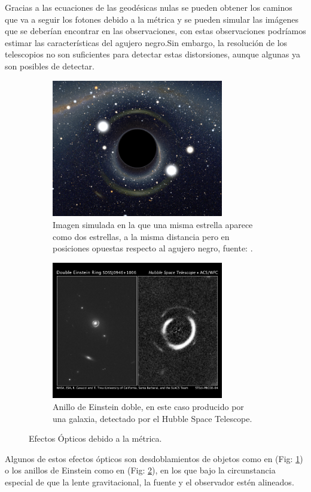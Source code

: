 \documentclass{article}
\begin{document}
Gracias a las ecuaciones de las geodésicas nulas se pueden obtener los caminos que va a seguir los fotones debido a la métrica y se pueden simular las imágenes que se deberían encontrar en las observaciones, con estas observaciones podríamos estimar las características del agujero negro.Sin embargo, la resolución de los telescopios no son suficientes para detectar estas distorsiones, aunque algunas ya son posibles de detectar.\cite{muller2007experimental} 

\begin{figure}[H]
\begin{subfigure}{0.5\textwidth}
\includegraphics[width=0.9\linewidth, height=6cm]{dobleEstrella_Alain.png} 
\caption{Imagen simulada en la que una misma estrella aparece como dos estrellas, a la misma distancia pero en posiciones opuestas respecto al agujero negro, fuente: \cite{riazuelo2019seeing}.}
\label{fig:dobleEstrella_Alain}
\end{subfigure}\hspace{1cm}
\begin{subfigure}{0.5\textwidth}
\includegraphics[width=0.9\linewidth, height=6cm]{DoubleEinsteinRing.jpg}
\caption{Anillo de Einstein doble, en este caso producido por una galaxia, detectado por el Hubble Space Telescope.}
\label{fig:DoubleEinsteinRing}
\end{subfigure}

\caption{Efectos Ópticos debido a la métrica.}
\label{fig:image2}
\end{figure}
Algunos de estos efectos ópticos son desdoblamientos de objetos como en (Fig: \ref{fig:dobleEstrella_Alain}) o los anillos de Einstein como en (Fig: \ref{fig:DoubleEinsteinRing}), en los que bajo la circunstancia especial de que la lente gravitacional, la fuente y el observador estén alineados.  
\end{document}

